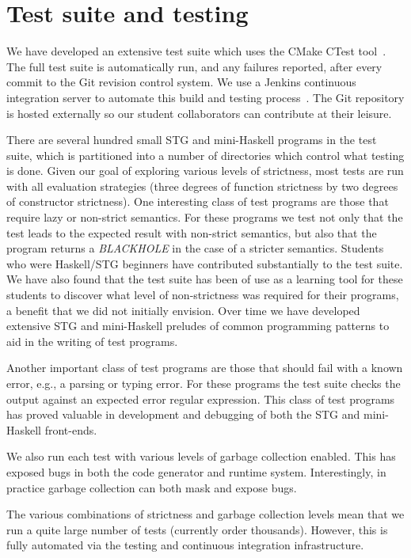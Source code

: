 \documentclass{llncs}
\begin{document}
\section{Test suite and testing}
\label{app:testing}
We have developed an extensive test suite which uses the CMake CTest
tool~\cite{cmake-book}. The full test suite is automatically run, and any
failures reported, after every commit to the Git revision control system. We
use a Jenkins continuous integration server to automate this build and testing
process~\cite{jenkins-book}. The Git repository is hosted externally so our
student collaborators can contribute at their leisure.

There are several hundred small STG and mini-Haskell programs in the test suite, 
which is partitioned into a number of directories which control what
testing is done. Given our goal of exploring various
levels of strictness, most tests are run with all evaluation strategies (three
degrees of function strictness by two degrees of constructor strictness).
One interesting class of test programs are those that require lazy or non-strict
semantics. For these programs we test not only that the test leads to the expected
result with non-strict semantics, but also that the program returns a
\emph{BLACKHOLE} in the case of a stricter semantics. Students who were Haskell/STG
beginners have contributed substantially to the test suite. We have also found
that the test suite has been of use as a learning tool for these students to
discover what level of non-strictness was required for their programs,
a benefit that we did not initially envision. Over time we have developed
extensive STG and mini-Haskell preludes of common programming patterns to
aid in the writing of test programs.

Another important class of test programs are those that should fail with a
known error, e.g., a parsing or typing error.  For these programs the test
suite checks the output against an expected error regular expression. This
class of test programs has proved valuable in development and debugging of
both the STG and mini-Haskell front-ends.

We also run each test with various levels of garbage collection enabled. This
has exposed bugs in both the code generator and runtime system.
Interestingly, in practice garbage collection can both mask and expose bugs.

The various combinations of strictness and garbage collection levels mean that
we run a quite large number of tests (currently order thousands). However,
this is fully automated via the testing and continuous integration
infrastructure.
\end{document}
